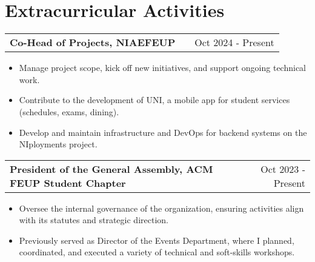 \documentclass[a4paper,12pt]{article}
\makeatletter
\newenvironment{joblong}[2]
    {
    \begin{tabularx}{\linewidth}{@{}l X r@{}}
    \textbf{#1} & \hfill &  #2 \\[3.75pt]
    \end{tabularx}
    \begin{minipage}[t]{\linewidth}
    \begin{itemize}[nosep,after=\strut, leftmargin=1em, itemsep=3pt,label=--]
    }
    {
    \end{itemize}
    \end{minipage}    
    }
\makeatother
\begin{document}









\section{Extracurricular Activities}

\begin{joblong}{Co-Head of Projects, NIAEFEUP}{Oct 2024 - Present}
    \item Manage project scope, kick off new initiatives, and support ongoing technical work.
    \item Contribute to the development of UNI, a mobile app for student services (schedules, exams, dining).
    \item Develop and maintain infrastructure and DevOps for backend systems on the NIployments project.
\end{joblong}

\begin{joblong}{President of the General Assembly, ACM FEUP Student Chapter}{Oct 2023 - Present}
    \item Oversee the internal governance of the organization, ensuring activities align with its statutes and strategic direction.
    \item Previously served as Director of the Events Department, where I planned, coordinated, and executed a variety of technical and soft-skills workshops.
\end{joblong}
\end{document}
